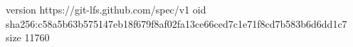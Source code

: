 version https://git-lfs.github.com/spec/v1
oid sha256:c58a5b63b575147eb18f679f8af02fa13ce66ced7c1e71f8cd7b583b6d6dd1c7
size 11760
